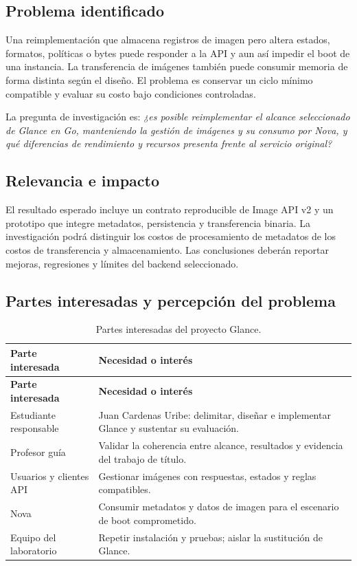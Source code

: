 \documentclass[12pt,a4paper]{article}
\newcommand{\reporttable}[4]{\begingroup\small\setlength{\LTpre}{8pt}\setlength{\LTpost}{8pt}\setlength{\tabcolsep}{4pt}\renewcommand{\arraystretch}{1.15}
\begin{longtable}{#2}\caption{#1}\\\toprule #3\\\midrule\endfirsthead
\toprule #3\\\midrule\endhead\bottomrule\endfoot #4\end{longtable}\endgroup}
\begin{document}
\subsection{Problema identificado}
Una reimplementación que almacena registros de imagen pero altera estados, formatos, políticas o bytes puede responder a la API y aun así impedir el boot de una instancia. La transferencia de imágenes también puede consumir memoria de forma distinta según el diseño. El problema es conservar un ciclo mínimo compatible y evaluar su costo bajo condiciones controladas.

La pregunta de investigación es: \textit{¿es posible reimplementar el alcance seleccionado de Glance en Go, manteniendo la gestión de imágenes y su consumo por Nova, y qué diferencias de rendimiento y recursos presenta frente al servicio original?}

\subsection{Relevancia e impacto}
El resultado esperado incluye un contrato reproducible de Image API v2 y un prototipo que integre metadatos, persistencia y transferencia binaria. La investigación podrá distinguir los costos de procesamiento de metadatos de los costos de transferencia y almacenamiento. Las conclusiones deberán reportar mejoras, regresiones y límites del backend seleccionado.

\subsection{Partes interesadas y percepción del problema}
\reporttable{Partes interesadas del proyecto Glance.}{>{\raggedright\arraybackslash}p{3.6cm}>{\raggedright\arraybackslash}p{11.4cm}}{\textbf{Parte interesada}&\textbf{Necesidad o interés}}{
Estudiante responsable&Juan Cardenas Uribe: delimitar, diseñar e implementar Glance y sustentar su evaluación.\\*
Profesor guía&Validar la coherencia entre alcance, resultados y evidencia del trabajo de título.\\*
Usuarios y clientes API&Gestionar imágenes con respuestas, estados y reglas compatibles.\\*
Nova&Consumir metadatos y datos de imagen para el escenario de boot comprometido.\\*
Equipo del laboratorio&Repetir instalación y pruebas; aislar la sustitución de Glance.\\}
\end{document}
